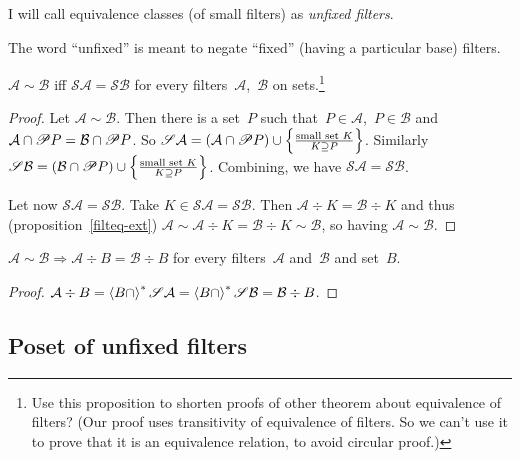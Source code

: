 \begin{defn}
I will call equivalence classes (of small filters) as
\emph{unfixed filters}.
\end{defn}

\begin{rem}
The word ``unfixed'' is meant to negate ``fixed'' (having
a particular base) filters.
\end{rem}

\begin{prop}\label{filteq-if-sim}
$\mathcal{A}\sim\mathcal{B}$ iff
$\mathscr{S}\mathcal{A}=\mathscr{S}\mathcal{B}$ for every
filters~$\mathcal{A}$,~$\mathcal{B}$ on sets.\footnote{Use this proposition to shorten proofs of other
theorem about equivalence of filters? (Our proof
uses transitivity of equivalence of filters. So we can't
use it to prove that it is an equivalence relation, to avoid circular proof.)}
\end{prop}

\begin{proof}
Let $\mathcal{A}\sim\mathcal{B}$. Then there is a set~$P$
such that~$P\in\mathcal{A}$,~$P\in\mathcal{B}$ and
$\mathcal{A}\cap\mathscr{P} P=\mathcal{B}\cap\mathscr{P} P$.
So $\mathscr{S}\mathcal{A} = (\mathcal{A}\cap\mathscr{P} P)\cup
\left\{ \frac{\text{small set }K}{K\supseteq P}\right\}$.
Similarly
$\mathscr{S}\mathcal{B} = (\mathcal{B}\cap\mathscr{P} P)\cup
\left\{ \frac{\text{small set }K}{K\supseteq P}\right\}$.
Combining, we have $\mathscr{S}\mathcal{A}=\mathscr{S}\mathcal{B}$.

Let now $\mathscr{S}\mathcal{A}=\mathscr{S}\mathcal{B}$.
Take $K\in\mathscr{S}\mathcal{A}=\mathscr{S}\mathcal{B}$.
Then $\mathcal{A}\div K=\mathcal{B}\div K$ and thus
(proposition~\ref{filteq-ext})
$\mathcal{A}\sim\mathcal{A}\div K =
\mathcal{B}\div K\sim\mathcal{B}$, so having
$\mathcal{A}\sim\mathcal{B}$.
\end{proof}

\begin{prop}\label{sim-rebase}
$\mathcal{A}\sim\mathcal{B} \Rightarrow
\mathcal{A}\div B=\mathcal{B}\div B$ for every
filters~$\mathcal{A}$ and~$\mathcal{B}$ and set~$B$.
\end{prop}

\begin{proof}
$\mathcal{A}\div B =
\left\langle B\cap\right\rangle ^{\ast}\mathscr{S}\mathcal{A} =
\left\langle B\cap\right\rangle ^{\ast}\mathscr{S}\mathcal{B} =
\mathcal{B}\div B$.
\end{proof}

\subsection{Poset of unfixed filters}

